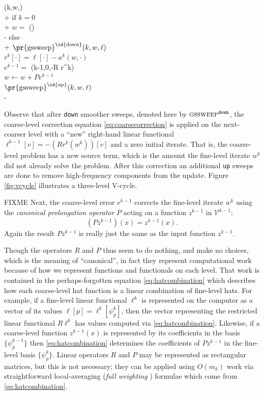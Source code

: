 \documentclass[letterpaper,final,12pt,reqno]{amsart}
\theoremstyle{claim}
\numberwithin{equation}{section}
\numberwithin{figure}{section}
\numberwithin{table}{section}
\begin{document}
\begin{pseudo*}
(k,w,\ell)\text{:} \\+
    if $k=0$ \\+
        $w =$ (\ell) \\-  %
    else \\+
        $\text{\pr{gssweep}}^{\text{\id{down}}}(k,w,\ell)$ \\
        $r^k[\cdot] = \ell[\cdot] - a^k(w,\cdot)$ \\
        $e^{k-1} =$ (k-1,0,-R r^k) \\
        $w \gets w + P e^{k-1}$ \\
        $\text{\pr{gssweep}}^{\text{\id{up}}}(k,w,\ell)$ \\-
\end{pseudo*}

Observe that after \texttt{down} smoother sweeps, denoted here by $\text{\textsc{gssweep}}^{\text{\texttt{down}}}$, the coarse-level correction equation \eqref{eq:coarsecorrection} is applied on the next-coarser level with a ``new'' right-hand linear functional $\ell^{k-1}[v]=-(R r^k(w^k))[v]$ and a zero initial iterate.  That is, the coarse-level problem has a new source term, which is the amount the fine-level iterate $w^k$ did not already solve the problem.  After this correction an additional \texttt{up} sweeps are done to remove high-frequency components from the update.  Figure \ref{fig:vcycle} illustrates a three-level V-cycle.

FIXME Next, the coarse-level error $e^{k-1}$ corrects the fine-level iterate $w^k$ using the \emph{canonical prolongation operator} $P$ acting on a function $z^{k-1}$ in $\mathcal{V}^{k-1}$:
\begin{equation}
  (P z^{k-1})(x) = z^{k-1}(x). \label{eq:canonicalprolongation}
\end{equation}
Again the result $P z^{k-1}$ is really just the same as the input function $z^{k-1}$.

Though the operators $R$ and $P$ thus seem to do nothing, and make no choices, which is the meaning of ``canonical'', in fact they represent computational work because of how we represent functions and functionals on each level.  That work is contained in the perhaps-forgotten equation \eqref{eq:hatcombination} which describes how each coarse-level hat function is a linear combination of fine-level hats.  For example, if a fine-level linear functional $\ell^k$ is represented on the computer as a vector of its values $\ell[p] = \ell^k[\psi_p^k]$, then the vector representing the restricted linear functional $R \ell^k$ has values computed via \eqref{eq:hatcombination}.  Likewise, if a coarse-level function $z^{k-1}(x)$ is represented by its coefficients in the basis $\{\psi_p^{k-1}\}$ then \eqref{eq:hatcombination} determines the coefficients of $P z^{k-1}$ in the fine-level basis $\{\psi_p^k\}$.  Linear operators $R$ and $P$ may be represented as rectangular matrices, but this is not necessary; they can be applied using $O(m_k)$ work via straightforward local-averaging (\emph{full weighting} \cite{Briggsetal2000}) formulae which come from \eqref{eq:hatcombination}.
\end{document}
